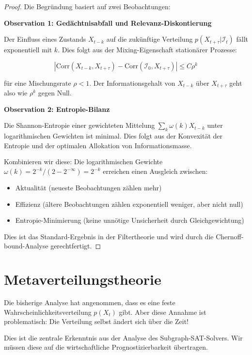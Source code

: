 \documentclass[12pt, a4paper, titlepage]{report}
\theoremstyle{definition}
\theoremstyle{remark}
\begin{document}
\begin{proof}
Die Begründung basiert auf zwei Beobachtungen:

\textbf{Observation 1: Gedächtnisabfall und Relevanz-Diskontierung}

Der Einfluss eines Zustands $X_{t-k}$ auf die zukünftige Verteilung $p(X_{t+\tau} | \mathcal{I}_t)$ fällt exponentiell mit $k$. Dies folgt aus der Mixing-Eigenschaft stationärer Prozesse:

\begin{equation}
|\text{Corr}(X_{t-k}, X_{t+\tau}) - \text{Corr}(\mathcal{I}_0, X_{t+\tau})| \leq C \rho^k
\end{equation}

für eine Mischungsrate $\rho < 1$. Der Informationsgehalt von $X_{t-k}$ über $X_{t+\tau}$ geht also wie $\rho^k$ gegen Null.

\textbf{Observation 2: Entropie-Bilanz}

Die Shannon-Entropie einer gewichteten Mittelung $\sum_k \omega(k) X_{t-k}$ unter logarithmischen Gewichten ist minimal. Dies folgt aus der Konvexität der Entropie und der optimalen Allokation von Informationsmasse.

Kombinieren wir diese: Die logarithmischen Gewichte $\omega(k) = 2^{-k} / (2 - 2^{-\infty}) = 2^{-k}$ erreichen einen Ausgleich zwischen:
\begin{itemize}
  \item Aktualität (neueste Beobachtungen zählen mehr)
  \item Effizienz (ältere Beobachtungen zählen exponentiell weniger, aber nicht null)
  \item Entropie-Minimierung (keine unnötige Unsicherheit durch Gleichgewichtung)
\end{itemize}

Dies ist das Standard-Ergebnis in der Filtertheorie und wird durch die Chernoff-bound-Analyse gerechtfertigt.
\end{proof}

\section{Metaverteilungstheorie}

Die bisherige Analyse hat angenommen, dass es eine feste Wahrscheinlichkeitsverteilung $p(X_t)$ gibt. Aber diese Annahme ist problematisch: Die Verteilung selbst ändert sich über die Zeit!

Dies ist die zentrale Erkenntnis aus der Analyse des Subgraph-SAT-Solvers. Wir müssen diese auf die wirtschaftliche Prognostizierbarkeit übertragen.
\end{document}
